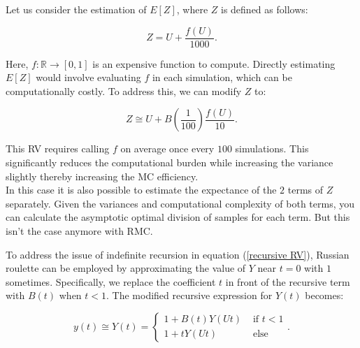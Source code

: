 \documentclass[a4paper,12pt]{article}
\begin{document}
\begin{example} \label{ex:simple russian roulette}
    Let us consider the estimation of $E[Z]$, where $Z$ is defined as follows:

    \begin{equation}
        Z = U + \frac{f(U)}{1000}.
    \end{equation}

    Here, $f:\mathbb{R} \rightarrow [0,1]$ is an expensive function to compute.
    Directly estimating $E[Z]$ would involve evaluating $f$ in each simulation,
    which can be computationally costly. To address this, we can modify $Z$ to:

    \begin{equation}
        Z \cong U + B\left(\frac{1}{100}\right)\frac{f(U)}{10}.
    \end{equation}

    This RV requires calling $f$ on
    average once every $100$ simulations. This significantly reduces the
    computational burden while increasing the variance slightly thereby increasing
    the MC efficiency.\\
    In this  case it is also possible to estimate
    the expectance of the $2$ terms of $Z$ separately. Given the variances and
    computational complexity of both terms, you can calculate the asymptotic optimal
    division of samples for each term. But this isn't the case anymore with RMC.
\end{example}


\begin{example} \label{ex: russian roulette}
    To address the issue of indefinite recursion in equation
    (\ref{recursive RV}), Russian roulette can be employed
    by approximating the value of $Y$ near $t = 0$ with $1$
    sometimes. Specifically, we replace the coefficient $t$
    in front of the recursive term with $B(t)$ when $t < 1$.
    The modified recursive expression for $Y(t)$ becomes:

    \begin{equation}\label{eq:rr example}
        y(t) \cong Y(t) =
        \begin{cases}
            1 + B(t)Y(Ut) & \text{ if } t < 1 \\
            1 + tY(Ut)    & \text{ else}
        \end{cases}.
    \end{equation}
\end{example}
\end{document}
